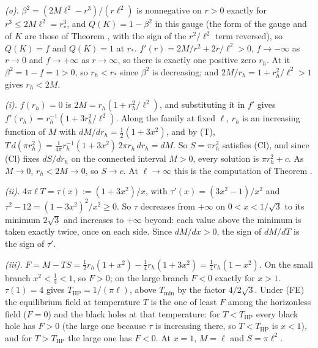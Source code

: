 \emph{(o).} $\beta^{2} = (2M\ell^{2} - r^{3})/(r\ell^{2})$ is nonnegative on $r > 0$ exactly for $r^{3} \le 2M\ell^{2} = r_{*}^{3}$, and $Q(K) = 1 - \beta^{2}$ in this gauge (the form of the gauge and of $K$ are those of Theorem , with the sign of the $r^{2}/\ell^{2}$ term reversed), so $Q(K) = f$ and $Q(K) = 1$ at $r_{*}$. $f'(r) = 2M/r^{2} + 2r/\ell^{2} > 0$, $f \to -\infty$ as $r \to 0$ and $f \to +\infty$ as $r \to \infty$, so there is exactly one positive zero $r_{h}$. At it $\beta^{2} = 1 - f = 1 > 0$, so $r_{h} < r_{*}$ since $\beta^{2}$ is decreasing; and $2M/r_{h} = 1 + r_{h}^{2}/\ell^{2} > 1$ gives $r_{h} < 2M$.

\emph{(i).} $f(r_{h}) = 0$ is $2M = r_{h}(1 + r_{h}^{2}/\ell^{2})$, and substituting it in $f'$ gives $f'(r_{h}) = r_{h}^{-1}(1 + 3r_{h}^{2}/\ell^{2})$. Along the family at fixed $\ell$, $r_{h}$ is an increasing function of $M$ with $dM/dr_{h} = \tfrac12(1 + 3x^{2})$, and by (T), $T\,d(\pi r_{h}^{2}) = \tfrac{1}{4\pi}r_{h}^{-1}(1 + 3x^{2})\,2\pi r_{h}\,dr_{h} = dM$. So $S = \pi r_{h}^{2}$ satisfies (Cl), and since (Cl) fixes $dS/dr_{h}$ on the connected interval $M > 0$, every solution is $\pi r_{h}^{2} + c$. As $M \to 0$, $r_{h} < 2M \to 0$, so $S \to c$. At $\ell \to \infty$ this is the computation of Theorem .

\emph{(ii).} $4\pi\ell T = \tau(x) := (1 + 3x^{2})/x$, with $\tau'(x) = (3x^{2} - 1)/x^{2}$ and $\tau^{2} - 12 = (1 - 3x^{2})^{2}/x^{2} \ge 0$. So $\tau$ decreases from $+\infty$ on $0 < x < 1/\sqrt{3}$ to its minimum $2\sqrt{3}$ and increases to $+\infty$ beyond: each value above the minimum is taken exactly twice, once on each side. Since $dM/dx > 0$, the sign of $dM/dT$ is the sign of $\tau'$.

\emph{(iii).} $F = M - TS = \tfrac12 r_{h}(1 + x^{2}) - \tfrac{1}{4}r_{h}(1 + 3x^{2}) = \tfrac14 r_{h}(1 - x^{2})$. On the small branch $x^{2} < \tfrac13 < 1$, so $F > 0$; on the large branch $F < 0$ exactly for $x > 1$. $\tau(1) = 4$ gives $T_{\mathrm{HP}} = 1/(\pi\ell)$, above $T_{\min}$ by the factor $4/2\sqrt{3}$. Under (FE) the equilibrium field at temperature $T$ is the one of least $F$ among the horizonless field ($F = 0$) and the black holes at that temperature: for $T < T_{\mathrm{HP}}$ every black hole has $F > 0$ (the large one because $\tau$ is increasing there, so $T < T_{\mathrm{HP}}$ is $x < 1$), and for $T > T_{\mathrm{HP}}$ the large one has $F < 0$. At $x = 1$, $M = \ell$ and $S = \pi\ell^{2}$.

